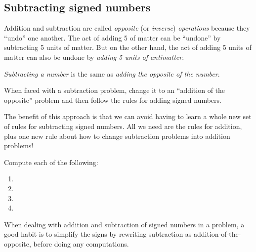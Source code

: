 \subsection{Subtracting signed numbers}

Addition and subtraction are called \textit{opposite} (or \textit{inverse}) \textit{operations} because they ``undo'' one another. The act of adding 5 of matter can be ``undone'' by subtracting 5 units of matter. But on the other hand, the act of adding 5 units of matter can also be undone by \textit{adding 5 units of antimatter}.

\begin{boxdef}
\textit{Subtracting a number} is the same as \textit{adding the opposite of the number}.

When faced with a subtraction problem, change it to an ``addition of the opposite'' problem and then follow the rules for adding signed numbers.
\end{boxdef}

The benefit of this approach is that we can avoid having to learn a whole new set of rules for subtracting signed numbers. All we need are the rules for addition, plus one new rule about how to change subtraction problems into addition problems!

\begin{boxex}
Compute each of the following:

\begin{enumerate}[itemsep=10pt]
\item {}

\item {}

\item {}

\item {}
\end{enumerate}
\end{boxex}

When dealing with addition and subtraction of signed numbers in a problem, a good habit is to simplify the signs by rewriting subtraction as addition-of-the-opposite, before doing any computations.

